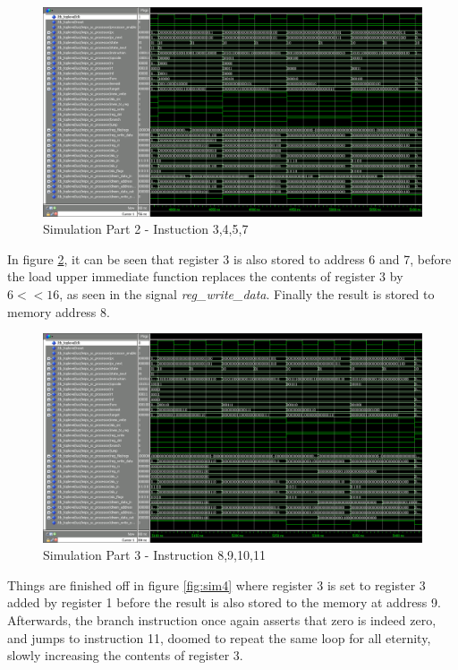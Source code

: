 \begin{figure}[ht]
    \centering
    \includegraphics[scale=0.3]{figures/sim2.png}
    \caption{\label{fig:sim2}Simulation Part 2 - Instuction 3,4,5,7}
\end{figure}

In figure \ref{fig:sim3}, it can be seen that register 3 is also stored to address 6 and 7, before the load upper immediate function replaces the contents of register 3 by $6 << 16$, as seen in the signal \emph{reg_write_data}. Finally the result is stored to memory address 8.

\begin{figure}[ht]
    \centering
    \includegraphics[scale=0.3]{figures/sim3.png}
    \caption{\label{fig:sim3}Simulation Part 3 - Instruction 8,9,10,11}
\end{figure}

Things are finished off in figure \ref{fig:sim4} where register 3 is set to register 3 added by register 1 before the result is also stored to the memory at address 9. Afterwards, the branch instruction once again asserts that zero is indeed zero, and jumps to instruction 11, doomed to repeat the same loop for all eternity, slowly increasing the contents of register 3.

